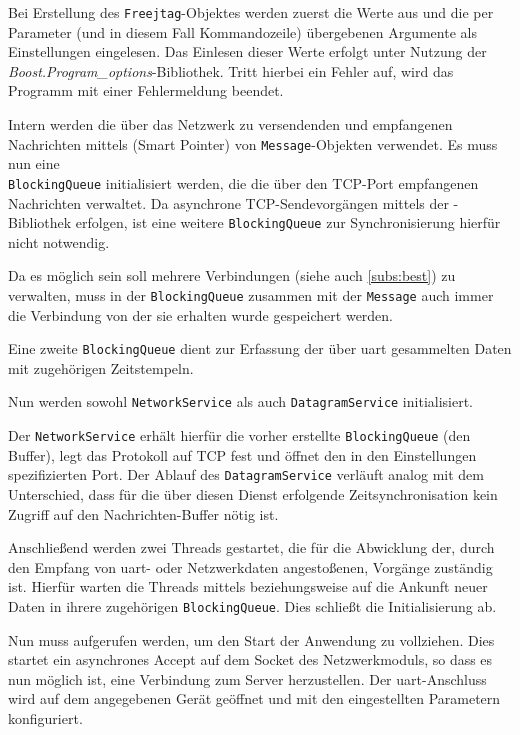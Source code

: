 Bei Erstellung des \texttt{Freejtag}-Objektes werden zuerst die Werte aus
 und die per Parameter (und in diesem Fall
Kommandozeile) übergebenen Argumente als Einstellungen eingelesen.
Das Einlesen dieser Werte erfolgt unter Nutzung der
\emph{Boost.Program\_options}-Bibliothek. Tritt hierbei ein Fehler auf, wird das
Programm mit einer Fehlermeldung beendet.

Intern werden die über das Netzwerk zu versendenden und empfangenen Nachrichten
mittels (Smart Pointer) von
\texttt{Message}-Objekten verwendet. Es muss nun eine \\\texttt{BlockingQueue}
initialisiert werden, die die über den TCP-Port empfangenen Nachrichten
verwaltet. Da asynchrone TCP-Sendevorgängen mittels der
-Bibliothek erfolgen, ist eine weitere
\texttt{BlockingQueue} zur Synchronisierung hierfür nicht notwendig.

Da es möglich sein soll mehrere Verbindungen (siehe auch \autoref{subs:best}) zu
verwalten, muss in der \texttt{BlockingQueue} zusammen mit der \texttt{Message}
auch immer die Verbindung von der sie erhalten wurde gespeichert werden.

Eine zweite \texttt{BlockingQueue} dient zur Erfassung der über \gls{uart}
gesammelten Daten mit zugehörigen Zeitstempeln. 

Nun werden sowohl \texttt{NetworkService} als auch \texttt{DatagramService}
initialisiert.

Der \texttt{NetworkService} erhält hierfür die vorher erstellte
\texttt{BlockingQueue} (den Buffer), legt das Protokoll auf TCP fest und
öffnet den in den Einstellungen spezifizierten Port. Der Ablauf des
\texttt{DatagramService} verläuft analog mit dem Unterschied, dass für die über
diesen Dienst erfolgende Zeitsynchronisation kein Zugriff auf den
Nachrichten-Buffer nötig ist.

Anschließend werden zwei Threads gestartet, die für die Abwicklung der, durch
den Empfang von \gls{uart}- oder Netzwerkdaten angestoßenen, Vorgänge
zuständig ist. Hierfür warten die Threads mittels  beziehungsweise \newline{} auf die Ankunft neuer Daten in ihrere zugehörigen
\texttt{BlockingQueue}. Dies schließt die Initialisierung ab.

Nun muss  aufgerufen werden, um den Start der
Anwendung zu vollziehen. Dies startet ein asynchrones Accept auf dem Socket des
Netzwerkmoduls, so dass es nun möglich ist, eine Verbindung zum Server
herzustellen. Der \gls{uart}-Anschluss wird auf dem angegebenen Gerät geöffnet
und mit den eingestellten Parametern konfiguriert.

